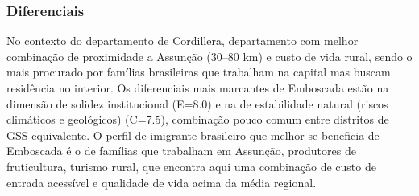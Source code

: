 \subsubsection*{Diferenciais}\label{dif-emboscada-0306}
No contexto do departamento de Cordillera, departamento com melhor combinação de proximidade a Assunção (30–80 km) e custo de vida rural, sendo o mais procurado por famílias brasileiras que trabalham na capital mas buscam residência no interior. Os diferenciais mais marcantes de Emboscada estão na dimensão de solidez institucional (E=8.0) e na de estabilidade natural (riscos climáticos e geológicos) (C=7.5), combinação pouco comum entre distritos de GSS equivalente. O perfil de imigrante brasileiro que melhor se beneficia de Emboscada é o de famílias que trabalham em Assunção, produtores de fruticultura, turismo rural, que encontra aqui uma combinação de custo de entrada acessível e qualidade de vida acima da média regional.
